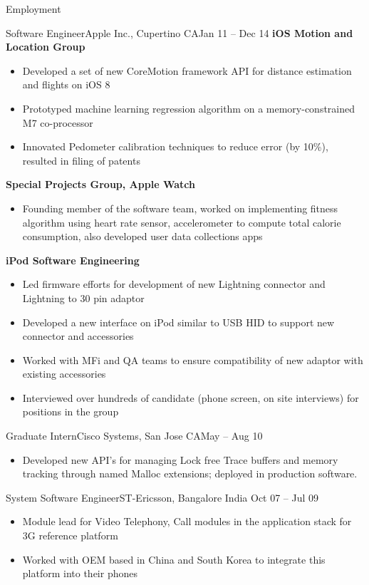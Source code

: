 \documentclass[]{mcdowellcv}
\begin{document}
\begin{cvsection}{Employment}
		\begin{cvsubsection}{Software Engineer}{Apple Inc., Cupertino CA}{Jan 11 -- Dec 14}	
			\textbf{iOS Motion and Location Group}
			\begin{itemize}
				\item Developed a set of new CoreMotion framework API for distance estimation and flights on iOS 8
				\item Prototyped machine learning regression algorithm on a memory-constrained M7 co-processor
				\item Innovated Pedometer calibration techniques to reduce error (by 10\%), resulted in filing of patents
			\end{itemize}

			\textbf{Special Projects Group, Apple Watch}
			\begin{itemize}
				\item Founding member of the software team, worked on implementing fitness algorithm using heart rate sensor, accelerometer to compute total calorie consumption, also developed user data collections apps
			\end{itemize}

			\textbf{iPod Software Engineering}
			\begin{itemize}
				\item Led firmware efforts for development of new Lightning connector and Lightning to 30 pin adaptor
				\item Developed a new interface on iPod similar to USB HID to support new connector and accessories
				\item Worked with MFi and QA teams to ensure compatibility of new adaptor with existing accessories
				\item Interviewed over hundreds of candidate (phone screen, on site interviews) for positions in the group
			\end{itemize}
		\end{cvsubsection}
		
		\begin{cvsubsection}{Graduate Intern}{Cisco Systems, San Jose CA}{May -- Aug 10}
			\begin{itemize}
				\item Developed new API’s for managing Lock free Trace buffers and memory tracking through named Malloc extensions; deployed in production software.
			\end{itemize}
		\end{cvsubsection}

		\begin{cvsubsection}{System Software Engineer}{ST-Ericsson, Bangalore India }{Oct 07 -- Jul 09}
			\begin{itemize}
				\item Module lead for Video Telephony, Call modules in the application stack for 3G reference platform
				\item Worked with OEM based in China and South Korea to integrate this platform into their phones
			\end{itemize}
		\end{cvsubsection}

	\end{cvsection}
	
\end{document}
